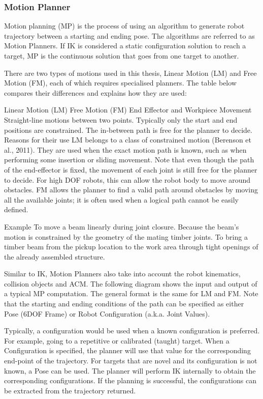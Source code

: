 \subsubsection{Motion Planner}

Motion planning (MP) is the process of using an algorithm to generate robot trajectory between a starting and ending pose. The algorithms are referred to as Motion Planners.  If IK is considered a static configuration solution to reach a target, MP is the continuous solution that goes from one target to another. 

There are two types of motions used in this thesis, Linear Motion (LM) and Free Motion (FM), each of which requires specialised planners. The table below compares their differences and explains how they are used: 


Linear Motion (LM) 
Free Motion (FM)
End Effector and Workpiece Movement
Straight-line motions between two points.
Typically only the start and end positions are constrained. The in-between path is free for the planner to decide.
Reasons for their use
LM belongs to a class of constrained motion (Berenson et al., 2011). They are used when the exact motion path is known, such as when performing some insertion or sliding movement. Note that even though the path of the end-effector is fixed, the movement of each joint is still free for the planner to decide. For high DOF robots, this can allow the robot body to move around obstacles.
FM allows the planner to find a valid path around obstacles by moving all the available joints; it is often used when a logical path cannot be easily defined.


Example
To move a beam linearly during joint closure. Because the beam’s motion is constrained by the geometry of the mating timber joints. 
To bring a timber beam from the pickup location to the work area through tight openings of the already assembled structure.

Similar to IK, Motion Planners also take into account the robot kinematics, collision objects and ACM. The following diagram shows the input and output of a typical MP computation. The general format is the same for LM and FM. Note that the starting and ending conditions of the path can be specified as either Pose (6DOF Frame) or Robot Configuration (a.k.a. Joint Values). 

Typically, a configuration would be used when a known configuration is preferred. For example, going to a repetitive or calibrated (taught) target. When a Configuration is specified, the planner will use that value for the corresponding end-point of the trajectory. For targets that are novel and its configuration is not known, a Pose can be used. The planner will perform IK internally to obtain the corresponding configurations. If the planning is successful, the configurations can be extracted from the trajectory returned.

